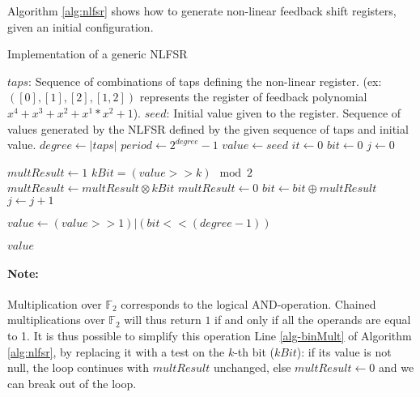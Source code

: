\documentclass{llncs}
\begin{document}
Algorithm \ref{alg:nlfsr} shows how to generate non-linear feedback shift registers, given an initial configuration.

\begin{algorithm}[ht]
  \caption{Implementation of a generic NLFSR}\label{alg:nlfsr}
  \begin{algorithmic}[1]
    \Require
      \Statex $taps$: Sequence of combinations of taps defining the non-linear register. (ex: $([0],[1],[2],[1,2])$ represents the register of feedback polynomial $x^4 + x^3 + x^2  + x^1*x^2 + 1$).
      \Statex $seed$: Initial value given to the register.
    \Ensure
      \Statex Sequence of values generated by the NLFSR defined by the given sequence of taps and initial value.
    \Statex
    \State $degree \gets |taps|$ 
    \State $period \gets 2^{degree} - 1$ 
    \State $value \gets seed$ 
    \State $it \gets 0$
        \State $bit \gets 0$ 
        \State $j \gets 0$
            
        		\State $multResult \gets 1$
                	\State $kBit = (value >> k) \mod 2$ 
                	\State $multResult \gets multResult \otimes kBit$ \label{alg-binMult}
                \EndFor
            \Else
            	\State $multResult \gets 0$
            \EndIf
            \State $bit \gets bit \oplus multResult$ 
            \State $j \gets j+1$
    	\EndFor
        
        \State $value \gets (value >> 1) | (bit << (degree-1))$
        
        \Return $value$ 
    \EndWhile
  \end{algorithmic}
\end{algorithm}

\paragraph{Note:} Multiplication over $\mathbb{F}_2$ corresponds to the logical AND-operation. Chained multiplications over  $\mathbb{F}_2$ will thus return $1$ if and only if all the operands are equal to 1. It is thus possible to simplify this operation Line \ref{alg-binMult} of Algorithm \ref{alg:nlfsr}, by replacing it with a test on the $k$-th bit ($kBit$): if its value is not null, the loop continues with $multResult$ unchanged, else $multResult \gets 0$ and we can break out of the loop.
\end{document}
